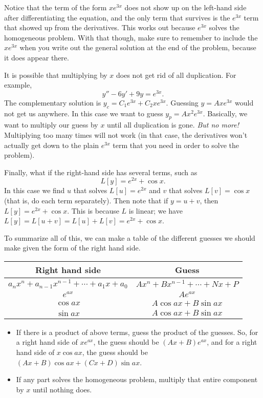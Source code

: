 Notice that the term of the form $xe^{3x}$ does not show up on the left-hand side after differentiating the equation, and the only term that survives is the $e^{3x}$ term that showed up from the derivatives. This works out because $e^{3x}$ solves the homogeneous problem. With that though, make sure to remember to include the $xe^{3x}$ when you write out the general solution at the end of the problem, because it does appear there.
\medskip

It is possible that
multiplying by $x$ does not get rid of all
duplication.  For example,
\begin{equation*}
y''-6y'+9y = e^{3x} .
\end{equation*}
The complementary solution is
$y_c = C_1 e^{3x} + C_2 x e^{3x}$.  Guessing $y=A xe^{3x}$
would not get us anywhere.  In this case we want to guess
$y_p = Ax^2e^{3x}$. Basically, we want to multiply our guess by $x$
until all duplication is gone.  \emph{But no more!}  Multiplying too many
times will not work (in that case, the derivatives won't actually get down to the plain $e^{3x}$ term that you need in order to solve the problem).

\medskip

Finally, what if the right-hand side has several terms, such as
\begin{equation*}
L[y] = e^{2x} + \cos x .
\end{equation*}
In this case we find $u$ that solves $L[u] = e^{2x}$ and $v$ that
solves $L[v] = \cos x$ (that is, do each term separately).  Then note
that if $y = u+ v$, then $L[y] = e^{2x} + \cos x$.  This is because
$L$ is linear; we have
$L[y] = L[u+v] = L[u] + L[v] = e^{2x} + \cos x$.

To summarize all of this, we can make a table of the different guesses we should make given the form of the right hand side.

\begin{table}[h!]
\begin{center}
\begin{tabular}{|c|c|}\hline
\textbf{Right hand side} & \textbf{Guess}  \\\hline 
$a_nx^n + a_{n-1}x^{n-1} + \cdots  + a_1x + a_0$ & $Ax^n + Bx^{n-1} + \cdots + Nx + P$ \\
$e^{ax}$ & $Ae^{ax}$ \\
$\cos{ax}$ & $A\cos{ax} + B\sin{ax}$ \\
$\sin{ax}$ & $A\cos{ax} + B\sin{ax}$ \\\hline
\end{tabular}
\end{center}
\begin{itemize}
\item If there is a product of above terms, guess the product of the guesses. So, for a right hand side of $ xe^{ax}$, the guess should be $(Ax + B)e^{ax}$, and for a right hand side of $x\cos{ax}$, the guess should be $(Ax + B)\cos{ax} + (Cx+D)\sin{ax}$.
\item If any part solves the homogeneous problem, multiply that entire component by $x$ until nothing does.
\end{itemize}
\end{table}

